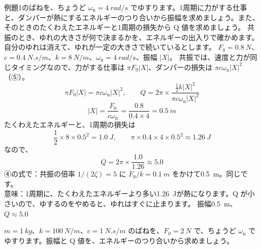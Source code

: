 \label{ph:波-2:ex2}
\begin{phreidai}[共振の振幅をエネルギーで求める]
例題1のばねを、ちょうど $\omega_{\mathrm n}=\qty{4}{rad/s}$ でゆすります。1周期に力がする仕事と、ダンパーが熱にするエネルギーのつり合いから振幅を求めましょう。また、そのときのたくわえたエネルギーと1周期の損失から Q 値を求めましょう。
\phbamen
共振のとき、ゆれの大きさが何で決まるかを、エネルギーの出入りで確かめます。
\phmushi
自分のゆれは消えて、ゆれが一定の大きさで続いているとします。
\phzu
$F_0=\qty{0.8}{N}$、$c=\qty{0.4}{N.s/m}$、$k=\qty{8}{N/m}$、$\omega_{\mathrm n}=\qty{4}{rad/s}$、振幅 $\lvert X\rvert$。
\phriyu
共振では、速度と力が同じタイミングなので、力がする仕事は $\pi F_0\lvert X\rvert$、ダンパーの損失は $\pi c\omega_{\mathrm n}\lvert X\rvert^2$（⑤）。
\phtateru
\[\pi F_0\lvert X\rvert=\pi c\omega_{\mathrm n}\lvert X\rvert^2,\qquad Q=2\pi\times\frac{\tfrac{1}{2}k\lvert X\rvert^2}{\pi c\omega_{\mathrm n}\lvert X\rvert^2}\]
\phtoku
\[\lvert X\rvert=\frac{F_0}{c\omega_{\mathrm n}}=\frac{0.8}{0.4\times4}=\qty{0.5}{m}\]
たくわえたエネルギーと、1周期の損失は
\[\frac{1}{2}\times8\times0.5^2=\qty{1.0}{J},\qquad \pi\times0.4\times4\times0.5^2\approx\qty{1.26}{J}\]
なので、
\[Q=2\pi\times\frac{1.0}{1.26}\approx5.0\]
\phtashikame
④の式で：共振の倍率 $1/(2\zeta)=5$ に $F_0/k=\qty{0.1}{m}$ をかけて\qty{0.5}{m}。同じです。\\
意味：1周期に、たくわえたエネルギーより多い\qty{1.26}{J}が熱になります。Q が小さいので、ゆするのをやめると、ゆれはすぐに止まります。
\kotae 振幅\qty{0.5}{m}、$Q\approx5.0$
\end{phreidai}
\begin{jibun}
$m=\qty{1}{kg}$、$k=\qty{100}{N/m}$、$c=\qty{1}{N.s/m}$ のばねを、$F_0=\qty{2}{N}$ で、ちょうど $\omega_{\mathrm n}$ でゆすります。振幅と Q 値を、エネルギーのつり合いから求めましょう。
\end{jibun}


